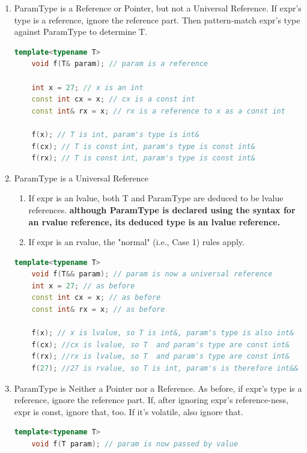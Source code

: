 \documentclass[a4paper,12pt,twoside]{book}
\begin{document}
\begin{enumerate}
	
	\item ParamType is a Reference or Pointer, but not a Universal Reference. If expr's type is a reference, ignore the reference part. Then pattern-match expr's type against ParamType to determine T.
	\begin{lstlisting}[frame=single, language=c++]
	template<typename T>
	void f(T& param); // param is a reference
	
	int x = 27; // x is an int
	const int cx = x; // cx is a const int
	const int& rx = x; // rx is a reference to x as a const int
	
	f(x); // T is int, param's type is int&
	f(cx); // T is const int, param's type is const int&
	f(rx); // T is const int, param's type is const int&
	\end{lstlisting}
	
	\item ParamType is a Universal Reference
	
	\begin{enumerate}
		\item If expr is an lvalue, both T and ParamType are deduced to be lvalue references.
		\textbf{although ParamType is declared using the syntax for an rvalue reference, its deduced type is an lvalue reference.}
		\item If expr is an rvalue, the "normal" (i.e., Case 1) rules apply.
	\end{enumerate}
	
	\begin{lstlisting}[frame=single, language=c++]
	template<typename T>
	void f(T&& param); // param is now a universal reference
	int x = 27; // as before
	const int cx = x; // as before
	const int& rx = x; // as before
	
	f(x); // x is lvalue, so T is int&, param's type is also int&
	f(cx); //cx is lvalue, so T  and param's type are const int&
	f(rx); //rx is lvalue, so T  and param's type are const int&
	f(27); //27 is rvalue, so T is int, param's is therefore int&&
	\end{lstlisting}
	
	\item ParamType is Neither a Pointer nor a Reference. As before, if expr's type is a reference, ignore the reference part. If, after ignoring expr's reference-ness, expr is const, ignore that, too. If it's
	volatile, also ignore that.
	\begin{lstlisting}[frame=single, language=c++]
	template<typename T>
	void f(T param); // param is now passed by value
	

\end{lstlisting}
\end{enumerate}
\end{document}
